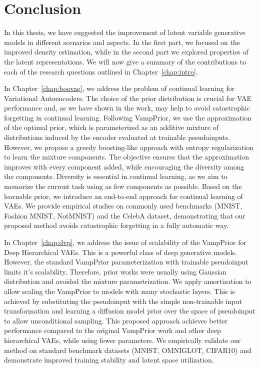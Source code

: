 \chapter{Conclusion}

In this thesis, we have suggested the improvement of latent variable generative models in different scenarios and aspects. In the first part, we focused on the improved density estimation, while in the second part we explored properties of the latent representations. 
We will now give a summary of the contributions to each of the research questions outlined in Chapter~\ref{chap:intro}.

In Chapter~\ref{chap:boovae}, we address the problem of continual learning for Variational Autoencoders. 
The choice of the prior distribution is crucial for VAE performance and, as we have shown in the work, may help to avoid catastrophic forgetting in continual learning. 
Following VampPrior, we use the approximation of the optimal prior, which is parameterized as an additive mixture of distributions induced by the encoder evaluated at trainable pseudoinputs. 
However, we propose a greedy boosting-like approach with entropy regularization to learn the mixture components. 
The objective ensures that the approximation improves with every component added, while encouraging the diversity among the components. 
Diversity is essential in continual learning, as we aim to memorize the current task using as few components as possible. 
Based on the learnable prior, we introduce an end-to-end approach for continual learning of VAEs. 
We provide empirical studies on commonly used benchmarks (MNIST, Fashion MNIST, NotMNIST) and the CelebA dataset, demonstrating that our proposed method avoids catastrophic forgetting in a fully automatic way.


In Chapter~\ref{chap:dvp}, we address the issue of scalability of the VampPrior for Deep Hierarchical VAEs. 
This is a powerful class of deep generative models.
However, the standard VampPrior parameterization with trainable pseudoinput limits it's scalability. 
Therefore, prior works were usually using Gaussian distribution and avoided the mixture parametrization.
We apply amortization to allow scaling the VampPrior to models with many stochastic layers. 
This is achieved by substituting the pseudoinput with the simple non-trainable input transformation and learning a diffusion model prior over the space of pseudoinput to allow unconditional sampling.
This proposed approach achieves better performance compared to the original VampPrior work and other deep hierarchical VAEs, while using fewer parameters. 
We empirically validate our method on standard benchmark datasets (MNIST, OMNIGLOT, CIFAR10) and demonstrate improved training stability and latent space utilization.

